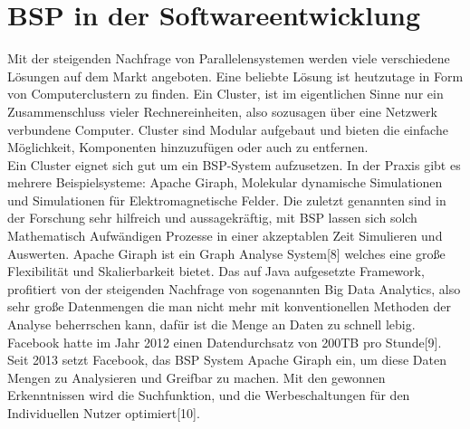 \documentclass[a4paper,10pt]{scrartcl}
\begin{document}
\section{BSP in der Softwareentwicklung}
Mit der steigenden Nachfrage von Parallelensystemen werden viele verschiedene Lösungen auf dem Markt angeboten. Eine beliebte Lösung ist heutzutage in Form von Computerclustern zu finden. Ein Cluster, ist im eigentlichen Sinne nur ein Zusammenschluss vieler Rechnereinheiten, also sozusagen über eine Netzwerk verbundene Computer. Cluster sind Modular aufgebaut und bieten die einfache Möglichkeit, Komponenten hinzuzufügen oder auch zu entfernen. \\
Ein Cluster eignet sich gut um ein BSP-System aufzusetzen. In der Praxis gibt es mehrere Beispielsysteme: Apache Giraph, Molekular dynamische Simulationen und Simulationen für Elektromagnetische Felder. Die zuletzt genannten sind in der Forschung sehr hilfreich und aussagekräftig, mit BSP lassen sich solch Mathematisch Aufwändigen Prozesse in einer akzeptablen Zeit Simulieren und Auswerten. Apache Giraph ist ein Graph Analyse System[8] welches eine große Flexibilität und Skalierbarkeit bietet. Das auf Java aufgesetzte Framework, profitiert von der steigenden Nachfrage von sogenannten Big Data Analytics, also sehr große Datenmengen die man nicht mehr mit konventionellen Methoden der Analyse beherrschen kann, dafür ist die Menge an Daten zu schnell lebig. Facebook hatte im Jahr 2012 einen Datendurchsatz von 200TB pro Stunde[9]. Seit 2013 setzt Facebook, das BSP System Apache Giraph ein, um diese Daten Mengen zu Analysieren und Greifbar zu machen. Mit den gewonnen Erkenntnissen wird die Suchfunktion, und die Werbeschaltungen für den Individuellen Nutzer optimiert[10].
\end{document}
